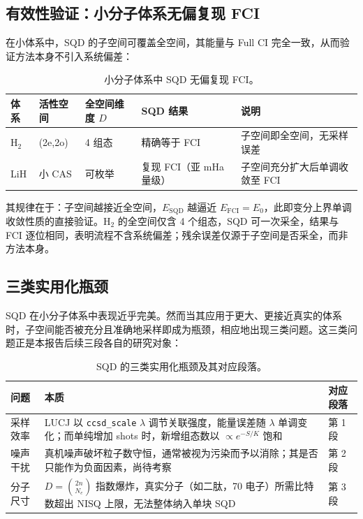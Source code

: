 \documentclass[UTF8,12pt,a4paper]{ctexart}
\newcommand{\Htwo}{H$_2$}
\begin{document}
\subsection{有效性验证：小分子体系无偏复现 FCI}

在小体系中，SQD 的子空间可覆盖全空间，其能量与 Full CI 完全一致，从而验证方法本身不引入系统偏差：

\begin{table}[H]
\centering
\caption{小分子体系中 SQD 无偏复现 FCI。}
\begin{tabular}{lllll}
\toprule
体系 & 活性空间 & 全空间维度 $D$ & SQD 结果 & 说明 \\
\midrule
\Htwo{} & (2e,2o) & 4 组态 & 精确等于 FCI & 子空间即全空间，无采样误差 \\
LiH & 小 CAS & 可枚举 & 复现 FCI（亚 mHa 量级） & 子空间充分扩大后单调收敛至 FCI \\
\bottomrule
\end{tabular}
\end{table}

其规律在于：子空间越接近全空间，$E_{\text{SQD}}$ 越逼近 $E_{\text{FCI}}=E_0$，此即变分上界单调收敛性质的直接验证。\Htwo{} 的全空间仅含 4 个组态，SQD 可一次采全，结果与 FCI 逐位相同，表明流程不含系统偏差；残余误差仅源于子空间是否采全，而非方法本身。

\subsection{三类实用化瓶颈}

SQD 在小分子体系中表现近乎完美。然而当其应用于更大、更接近真实的体系时，子空间能否被充分且准确地采样即成为瓶颈，相应地出现三类问题。这三类问题正是本报告后续三段各自的研究对象：

\begin{table}[H]
\centering
\caption{SQD 的三类实用化瓶颈及其对应段落。}
\begin{tabular}{p{2.2cm}p{9.5cm}p{2cm}}
\toprule
问题 & 本质 & 对应段落 \\
\midrule
采样效率 & LUCJ 以 \texttt{ccsd\_scale} $\lambda$ 调节关联强度，能量误差随 $\lambda$ 单调变化；而单纯增加 shots 时，新增组态数以 $\propto e^{-S/K}$ 饱和 & 第 1 段 \\
噪声干扰 & 真机噪声破坏粒子数守恒，通常被视为污染而予以消除；其是否只能作为负面因素，尚待考察 & 第 2 段 \\
分子尺寸 & $D=\binom{2n}{N_e}$ 指数爆炸，真实分子（如二肽，70 电子）所需比特数超出 NISQ 上限，无法整体纳入单块 SQD & 第 3 段 \\
\bottomrule
\end{tabular}
\end{table}
\end{document}
